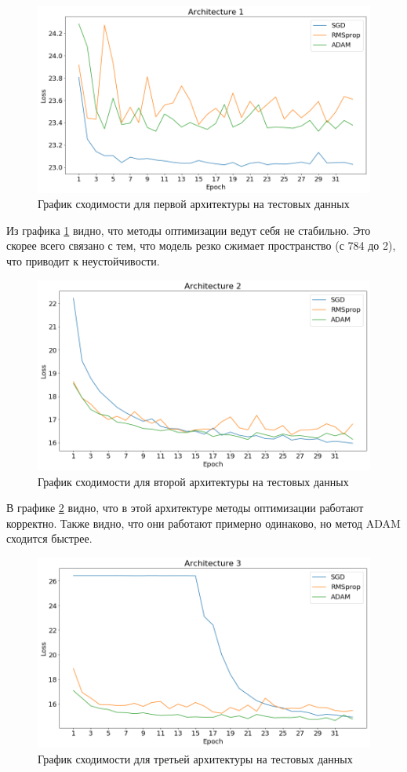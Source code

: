 \documentclass[12pt, a4paper]{article}
\begin{document}
            \begin{figure}[p]
                \centering
                \includegraphics[width=0.7\linewidth]{pics/arch1_loss}
                \caption{График сходимости для первой архитектуры на тестовых данных}
                \label{fig:arch1_loss}
            \end{figure}

            Из графика \ref{fig:arch1_loss} видно, что методы оптимизации ведут себя не стабильно. Это скорее всего связано с тем, что модель резко сжимает пространство (с 784 до 2), что приводит к неустойчивости.

            \begin{figure}[p]
                \centering
                \includegraphics[width=0.7\linewidth]{pics/arch2_loss}
                \caption{График сходимости для второй архитектуры на тестовых данных}
                \label{fig:arch2_loss}
            \end{figure}

            В графике \ref{fig:arch2_loss} видно, что в этой архитектуре методы оптимизации работают корректно. Также видно, что они работают примерно одинаково, но метод ADAM сходится быстрее.

            \begin{figure}[p]
                \centering
                \includegraphics[width=0.7\linewidth]{pics/arch3_loss}
                \caption{График сходимости для третьей архитектуры на тестовых данных}
                \label{fig:arch3_loss}
            \end{figure}
\end{document}
